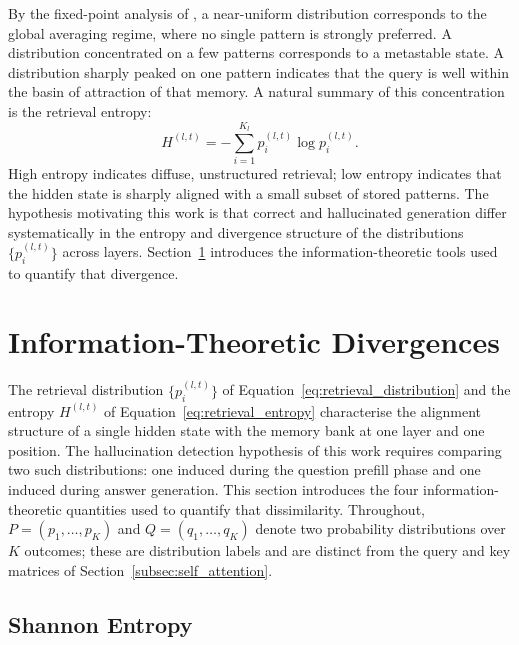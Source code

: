 By the fixed-point analysis of \citet{ramsauer2020hopfield}, a near-uniform
distribution corresponds to the global averaging regime, where no single pattern is
strongly preferred. A distribution concentrated on a few patterns corresponds to a
metastable state. A distribution sharply peaked on one pattern indicates that the
query is well within the basin of attraction of that memory. A natural summary of
this concentration is the retrieval entropy:
\begin{equation}
    H^{(l,t)}
    =
    -\sum_{i=1}^{K_l} p_i^{(l,t)} \log p_i^{(l,t)}.
    \label{eq:retrieval_entropy}
\end{equation}
High entropy indicates diffuse, unstructured retrieval; low entropy indicates that
the hidden state is sharply aligned with a small subset of stored patterns. The
hypothesis motivating this work is that correct and hallucinated generation differ
systematically in the entropy and divergence structure of the distributions
$\bigl\{p_i^{(l,t)}\bigr\}$ across layers. Section~\ref{sec:divergences}
introduces the information-theoretic tools used to quantify that divergence.

\section{Information-Theoretic Divergences}
\label{sec:divergences}

The retrieval distribution $\{p_i^{(l,t)}\}$ of Equation~\eqref{eq:retrieval_distribution}
and the entropy $H^{(l,t)}$ of Equation~\eqref{eq:retrieval_entropy} characterise
the alignment structure of a single hidden state with the memory bank at one layer
and one position. The hallucination detection hypothesis of this work requires
comparing two such distributions: one induced during the question prefill phase and
one induced during answer generation. This section introduces the four
information-theoretic quantities used to quantify that dissimilarity. Throughout,
$P = (p_1, \ldots, p_K)$ and $Q = (q_1, \ldots, q_K)$ denote two probability
distributions over $K$ outcomes; these are distribution labels and are distinct from
the query and key matrices of Section~\ref{subsec:self_attention}.

\subsection{Shannon Entropy}
\label{subsec:shannon_entropy}

